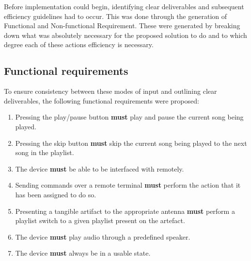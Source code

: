 Before implementation could begin, identifying clear deliverables and subsequent efficiency guidelines had to occur. This was done through the generation of Functional and Non-functional Requirement. These were generated by breaking down what was absolutely necessary for the proposed solution to do and to which degree each of these actions efficiency is necessary.

\subsection{Functional requirements}\label{subsec:funcreq}
To ensure consistency between these modes of input and outlining clear deliverables, the following functional requirements were proposed:
\begin{enumerate}
    \item\label{req:playBtn} Pressing the play/pause button \textbf{must} play and pause the current song being played.
    \item\label{req:skipBtn} Pressing the skip button \textbf{must} skip the current song being played to the next song in the playlist.
    \item\label{req:remoteCon} The device \textbf{must} be able to be interfaced with remotely.
    \item\label{req:correctCommand} Sending commands over a remote terminal \textbf{must} perform the action that it has been assigned to do so.
    \item\label{req:NFCcorrect} Presenting a tangible artifact to the appropriate antenna \textbf{must} perform a playlist switch to a given playlist present on the artefact.
    \item\label{req:audioPlayback} The device \textbf{must} play audio through a predefined speaker.
    \item\label{req:usable} The device \textbf{must} always be in a usable state. 
\end{enumerate}
